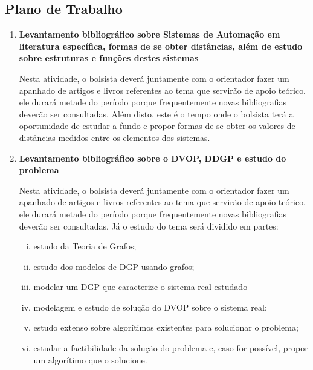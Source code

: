 \documentclass[11pt]{article}
\begin{document}
{{	\subsection{Plano de Trabalho}
	
	\begin{enumerate}[(1)]
		
	\item {\bf Levantamento bibliográfico sobre Sistemas de Automação em literatura específica, formas de se obter distâncias, além de estudo sobre estruturas e funções destes sistemas}
	
	\vspace{0.2cm}
	
	Nesta atividade, o bolsista deverá juntamente com o orientador fazer um apanhado de artigos e livros referentes ao tema que servirão de apoio teórico. ele durará metade do período porque frequentemente novas bibliografias deverão ser consultadas. Além disto, este é o tempo onde o bolsista terá a oportunidade de estudar a fundo e propor formas de se obter os valores de distâncias medidos entre os elementos dos sistemas.
	
	\item {\bf Levantamento bibliográfico sobre o DVOP, DDGP e estudo do problema}
	
	\vspace{0.2cm}
	
	Nesta atividade, o bolsista deverá juntamente com o orientador fazer um apanhado de artigos e livros referentes ao tema que servirão de apoio teórico. ele durará metade do período porque frequentemente novas bibliografias deverão ser consultadas. Já o estudo do tema será dividido em partes: 
	
	\begin{enumerate}[(i)]
		\item estudo da Teoria de Grafos;
		
		\item estudo dos modelos de DGP usando grafos;
		
		\item modelar um DGP que caracterize o sistema real estudado
		
		\item modelagem e estudo de solução do DVOP sobre o sistema real;
		
		\item estudo extenso sobre algorítimos existentes para solucionar o problema;
		
		\item estudar a factibilidade da solução do problema e, caso for possível, propor um algorítimo que o solucione.
		

\end{enumerate}
\end{enumerate}}}
\end{document}
